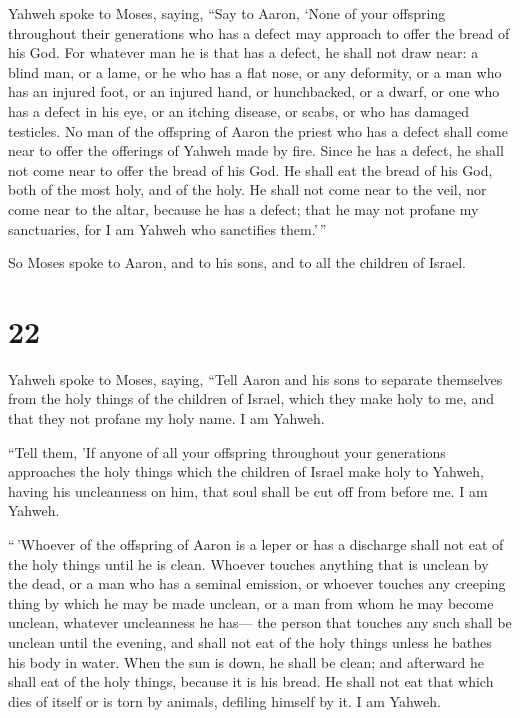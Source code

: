  Yahweh spoke to Moses, saying,  ``Say to
Aaron, `None of your offspring throughout their generations who has a
defect may approach to offer the bread of his God.  For
whatever man he is that has a defect, he shall not draw near: a blind
man, or a lame, or he who has a flat nose, or any deformity,
 or a man who has an injured foot, or an injured hand,
 or hunchbacked, or a dwarf, or one who has a defect in
his eye, or an itching disease, or scabs, or who has damaged testicles.
 No man of the offspring of Aaron the priest who has a
defect shall come near to offer the offerings of Yahweh made by fire.
Since he has a defect, he shall not come near to offer the bread of his
God.  He shall eat the bread of his God, both of the most
holy, and of the holy.  He shall not come near to the
veil, nor come near to the altar, because he has a defect; that he may
not profane my sanctuaries, for I am Yahweh who sanctifies them.'\,''

 So Moses spoke to Aaron, and to his sons, and to all the
children of Israel.

\hypertarget{section-21}{%
\section{22}\label{section-21}}

 Yahweh spoke to Moses, saying,  ``Tell
Aaron and his sons to separate themselves from the holy things of the
children of Israel, which they make holy to me, and that they not
profane my holy name. I am Yahweh.

 ``Tell them, 'If anyone of all your offspring throughout
your generations approaches the holy things which the children of Israel
make holy to Yahweh, having his uncleanness on him, that soul shall be
cut off from before me. I am Yahweh.

 ``\,'Whoever of the offspring of Aaron is a leper or has
a discharge shall not eat of the holy things until he is clean. Whoever
touches anything that is unclean by the dead, or a man who has a seminal
emission,  or whoever touches any creeping thing by which
he may be made unclean, or a man from whom he may become unclean,
whatever uncleanness he has---  the person that touches
any such shall be unclean until the evening, and shall not eat of the
holy things unless he bathes his body in water.  When the
sun is down, he shall be clean; and afterward he shall eat of the holy
things, because it is his bread.  He shall not eat that
which dies of itself or is torn by animals, defiling himself by it. I am
Yahweh.

